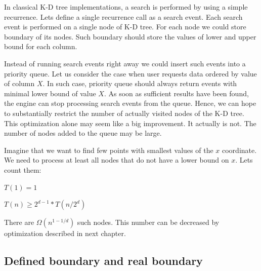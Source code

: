 \documentclass[10pt,a4paper]{article}
\begin{document}
In classical K-D tree implementations, a search is performed by using a simple recurrence. Lets define a single recurrence call as a search event. Each search event is performed on a single node of K-D tree. For each node we could store boundary of its nodes. Such boundary should store the values of lower and upper bound for each column.

Instead of running search events right away we could insert such events into a priority queue. Let us consider the case when user requests data ordered by value of column $X$. In such case, priority queue should always return events with minimal lower bound of value $X$. As soon as sufficient results have been found, the engine can stop processing search events from the queue. Hence, we can hope to substantially restrict the number of actually visited nodes of the K-D tree. This optimization alone may seem like a big improvement. It actually is not. The number of nodes added to the queue may be large.

Imagine that we want to find few points with smallest values of the $x$ coordinate. We need to process at least all nodes
that do not have a lower bound on $x$. Lets count them:
\bigskip

$T(1) = 1$

$T(n) \geq 2^{d-1} * T(n/2^{d})$

\bigskip

There are $\Omega (n^{1-1/d})$ such nodes. This number can be decreased by optimization described in next chapter.

\subsection{Defined boundary and real boundary}
\end{document}
